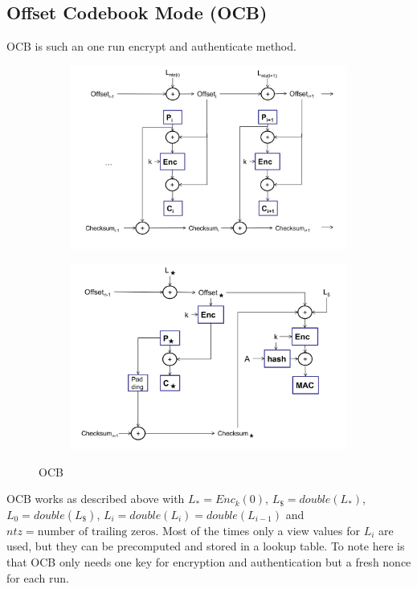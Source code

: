 \subsection{Offset Codebook Mode (OCB)}
OCB is such an one run encrypt and authenticate method.
\begin{figure}[H]
\centering
\begin{subfigure}{.5\textwidth}
  \centering
  \includegraphics[width=\textwidth]{figures/ocb_encryption.png}
\end{subfigure}%
\begin{subfigure}{.5\textwidth}
  \centering
  \includegraphics[width=\textwidth]{figures/ocb_mac.png}
\end{subfigure}
\caption{OCB}
\end{figure}
OCB works as described above with $L_* = Enc_k(0)$, $L_{\$} = double(L_*)$, $L_0 = double(L_{\$})$, $L_i = double(L_i) = double(L_{i-1})$ and $ntz = \text{number of trailing zeros}$.
Most of the times only a view values for $L_i$ are used, but they can be precomputed and stored in a lookup table.
To note here is that OCB only needs one key for encryption and authentication but a fresh nonce for each run.

